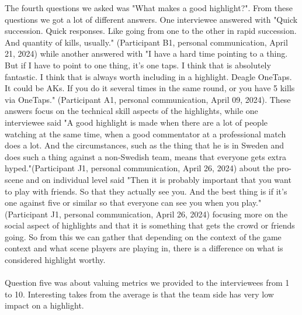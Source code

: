 The fourth questions we asked was "What makes a good highlight?". From these questions we got a lot of different answers. One interviewee answered with "Quick succession. Quick responses. Like going from one to the other in rapid succession. And quantity of kills, usually." (Participant B1, personal communication, April 21, 2024) while another answered with "I have a hard time pointing to a thing. But if I have to point to one thing, it's one taps. I think that is absolutely fantastic. I think that is always worth including in a highlight. Deagle OneTaps. It could be AKs. If you do it several times in the same round, or you have 5 kills via OneTaps." (Participant A1, personal communication, April 09, 2024). These answers focus on the technical skill aspects of the highlights, while one interviewee said "A good highlight is made when there are a lot of people watching at the same time, when a good commentator at a professional match does a lot. And the circumstances, such as the thing that he is in Sweden and does such a thing against a non-Swedish team, means that everyone gets extra hyped."(Participant J1, personal communication, April 26, 2024) about the pro-scene and on individual level said "Then it is probably important that you want to play with friends. So that they actually see you. And the best thing is if it's one against five or similar so that everyone can see you when you play." (Participant J1, personal communication, April 26, 2024) focusing more on the social aspect of highlights and that it is something that gets the crowd or friends going. So from this we can gather that depending on the context of the game context and what scene players are playing in, there is a difference on what is considered highlight worthy.\\\\
Question five was about valuing metrics we provided to the interviewees from 1 to 10. Interesting takes from the average is that the team side has very low impact on a highlight.\\\\
